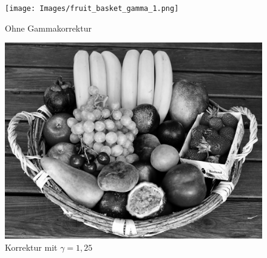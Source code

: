 \documentclass[course=erap]{aspdoc}
\begin{document}
\begin{figure}[h]
    \begin{minipage}{0.49\linewidth}
        \centering
        \texttt{[image: Images/fruit\_basket\_gamma\_1.png]}
        \caption{Ohne Gammakorrektur}
    \end{minipage}
    \centering
    \begin{minipage}{0.49\linewidth}
        \centering
        \includegraphics[scale=1.2]{Images/fruit_basket_gamma_1,25.png}
        \caption{Korrektur mit $\gamma = 1,25$}
    \end{minipage}
\end{figure}
\end{document}
